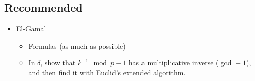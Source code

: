 
\subsection{Recommended}
\begin{itemize}
\item El-Gamal
  \begin{itemize}
  \item Formulas (as much as possible)
  \item In $\delta$, show that $k^{-1} \mod p-1$ has a multiplicative
    inverse ($\gcd \equiv 1$), and then find it with Euclid's extended
    algorithm.
  \end{itemize}
\end{itemize}
